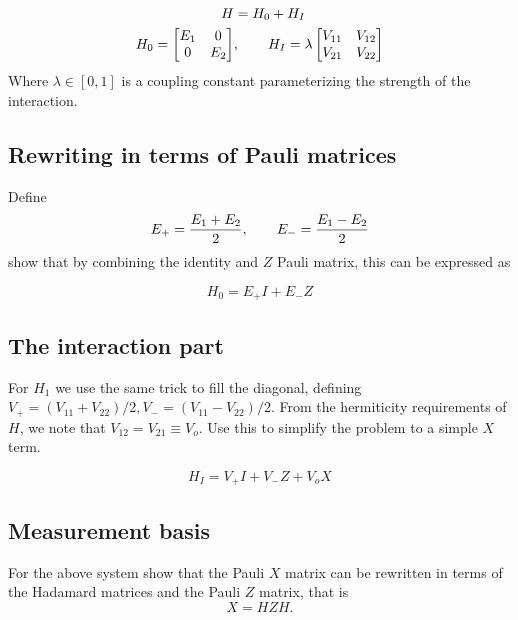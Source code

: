 \documentclass[%
oneside,                 %
final,                   %
10pt]{article}
\begin{document}
\begin{align*}
    \begin{split} 
        H &= H_0 + H_I \\
        H_0 = \begin{bmatrix}
            E_1 & 0 \\
            0 & E_2
        \end{bmatrix}&, \hspace{20px}
        H_I = \lambda \begin{bmatrix}
            V_{11} & V_{12} \\
            V_{21} & V_{22}
        \end{bmatrix}
    \end{split}
\end{align*}
Where $\lambda \in [0,1]$ is a coupling constant parameterizing the strength of the interaction. 

\subsection{Rewriting in terms of Pauli matrices}

Define
\[
    E_+ = \frac{E_1 + E_2}{2},\hspace{20px} E_- = \frac{E_1 - E_2}{2}
\]
show  that by combining the identity and $Z$ Pauli matrix, this can be expressed as

\[
    H_0 = E_+ I + E_- Z
\]

\subsection{The interaction part}

For $H_1$ we use the same trick to fill the diagonal, defining $V_+ = (V_{11} + V_{22})/2, V_- = (V_{11} - V_{22})/2$. From the hermiticity requirements of $H$, we note that $V_{12} = V_{21} \equiv V_o$. Use this to simplify the problem to a simple $X$ term. 

\[
    H_I = V_+ I + V_- Z + V_o X
\]

\subsection{Measurement basis}

For the above system show that the Pauli $X$ matrix can be rewritten in terms of the Hadamard matrices and the Pauli $Z$ matrix, that is
\[
X=HZH.
\]



\end{document}
